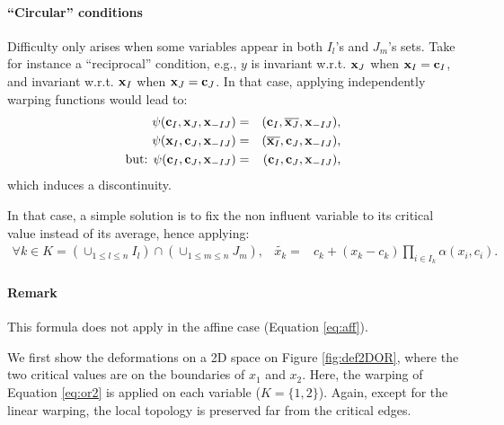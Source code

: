 	\paragraph{``Circular'' conditions}
	Difficulty only arises when some variables appear in both $I_l$'s and $J_m$'s sets. Take for instance a ``reciprocal'' condition, 
	e.g., $y$ is invariant w.r.t. $\mathbf{x}_J$ when $\mathbf{x}_I=\mathbf{c}_I$, and invariant w.r.t. $\mathbf{x}_I$ when $\mathbf{x}_J=\mathbf{c}_J$.
	In that case, applying independently warping functions would lead to: 
	\begin{eqnarray*}
		\psi(\mathbf{c}_I, \mathbf{x}_J, \mathbf{x}_{-IJ}) &=& (\mathbf{c}_I, \overline{\mathbf{x}_J}, \mathbf{x}_{-IJ}),\\
		\psi(\mathbf{x}_I, \mathbf{c}_J, \mathbf{x}_{-IJ}) &=& (\overline{\mathbf{x}_I}, \mathbf{c}_J, \mathbf{x}_{-IJ}),\\
		\text{but: } \psi(\mathbf{c}_I, \mathbf{c}_J, \mathbf{x}_{-IJ}) &=& (\mathbf{c}_I, \mathbf{c}_J, \mathbf{x}_{-IJ}),
	\end{eqnarray*}
	which induces a discontinuity.
	
	In that case, a simple solution is to fix the non influent variable to its critical value instead of its average, hence applying:
	\begin{eqnarray}
	\forall k \in K= \left( \cup_{1 \leq l \leq n} I_l \right) \cap \left(\cup_{1 \leq m \leq n} J_m \right), &\widetilde{x_k} =& c_k + \left( x_k - c_k\right) \prod_{i \in I_k} \alpha(x_i, c_{i})\label{eq:or2}.
	\end{eqnarray}
	
	\paragraph{Remark} This formula does not apply in the affine case (Equation \ref{eq:aff}).
	
	We first show the deformations on a 2D space on Figure \ref{fig:def2DOR}, where the two critical values are on the boundaries of $x_1$ and $x_2$.
	Here, the warping of Equation \ref{eq:or2} is applied on each variable ($K=\{1,2\}$). 
	Again, except for the linear warping, the local topology is preserved far from the critical edges. 
	

